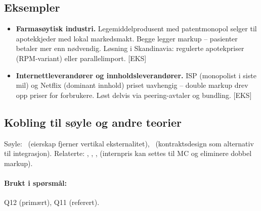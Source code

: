 \subsection*{Eksempler}
\begin{itemize}\setlength{\itemsep}{2pt}
\item \textbf{Farmasøytisk industri.} Legemiddelprodusent med patentmonopol selger til apotekkjeder med lokal markedsmakt. Begge legger markup -- pasienter betaler mer enn nødvendig. Løsning i Skandinavia: regulerte apotekpriser (RPM-variant) eller parallelimport. [EKS]
\item \textbf{Internettleverandører og innholdsleverandører.} ISP (monopolist i siste mil) og Netflix (dominant innhold) priset uavhengig -- double markup drev opp priser for forbrukere. Løst delvis via peering-avtaler og bundling. [EKS]
\end{itemize}

\subsection*{Kobling til søyle og andre teorier}
Søyle: \SOne\ (eierskap fjerner vertikal eksternalitet), \SThree\ (kontraktsdesign som alternativ til integrasjon). Relaterte: , , ,  (internpris kan settes til MC og eliminere dobbel markup).

\paragraph{Brukt i spørsmål:} Q12 (primært), Q11 (referert).
